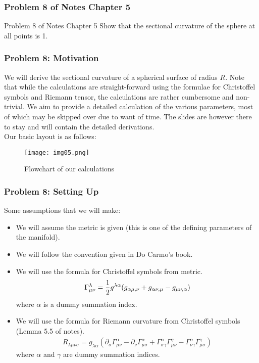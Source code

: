 \begin{frame}
\frametitle{Problem 8 of Notes Chapter 5}
\begin{block}{Problem 8 of Notes Chapter 5}
Show that the sectional curvature of the sphere at all points is 1.
\end{block}
\end{frame}

\begin{frame}
\frametitle{Problem 8: Motivation}
We will derive the sectional curvature of a spherical surface of radius $R$. Note that while the calculations are straight-forward using the formulae for Christoffel symbols and Riemann tensor, the calculations are rather cumbersome and non-trivial. We aim to provide a detailed calculation of the various parameters, most of which may be skipped over due to want of time. The slides are however there to stay and will contain the detailed derivations.\\
\pause
Our basic layout is as follows:\\
\begin{figure}[!htb]
	\centering
   \begin{minipage}{0.8\textwidth}
     \centering
     \texttt{[image: img05.png]}
     \caption{{Flowchart of our calculations}}
     \label{fig:05}
   \end{minipage}
\end{figure}
\end{frame}

\begin{frame}
\frametitle{Problem 8: Setting Up}
Some assumptions that we will make:
\begin{itemize}
\item We will assume the metric is given (this is one of the defining parameters of the manifold).\pause
\item We will follow the convention given in Do Carmo's book.\pause
\item We will use the formula for Christoffel symbols from metric.
\begin{align}
\label{christoffel symbols}
\Gamma^{\lambda}_{\mu\nu}=\frac{\displaystyle 1}{\displaystyle 2}g^{\lambda\alpha}(g_{\alpha\mu ,\nu}+g_{\alpha\nu ,\mu}-g_{\mu\nu ,\alpha})
\end{align}
where $\alpha$ is a dummy summation index.\pause
\item We will use the formula for Riemann curvature from Christoffel symbols (Lemma 5.5 of notes).
\begin{align}
\label{riemann curvature tensor}
R_{\lambda\mu\nu\sigma}=g_{\lambda\alpha}(\partial_\sigma\Gamma^{\alpha}_{\mu\nu}-\partial_\nu\Gamma^{\alpha}_{\mu\sigma}+\Gamma^{\alpha}_{\sigma\gamma}\Gamma^{\gamma}_{\mu\nu}-\Gamma^{\alpha}_{\nu\gamma}\Gamma^{\gamma}_{\mu\sigma})
\end{align}
where $\alpha$ and $\gamma$ are dummy summation indices.
\end{itemize}
\end{frame}

